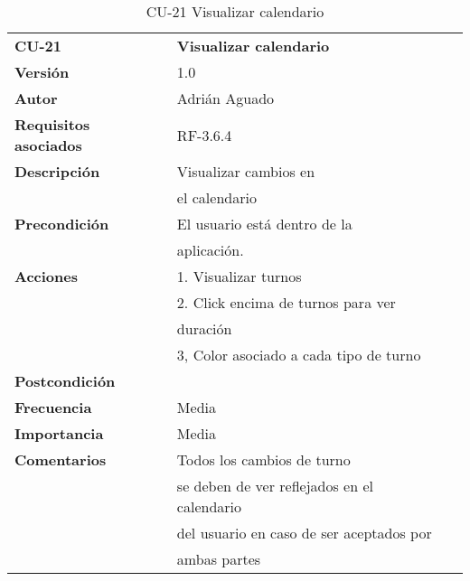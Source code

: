 \begin{table}[H]
\begin{tabular}{llr}  
\toprule
\begin{minipage}[b]{0.24\columnwidth}\raggedright\strut
\textbf{CU-21}\strut
\end{minipage} & \begin{minipage}[b]{0.72\columnwidth}\raggedright\strut
\textbf{Visualizar calendario}\strut
\end{minipage}\tabularnewline
\cmidrule(r){1-2}
\textbf{Versión}       & 1.0           \\
\textbf{Autor}       & Adrián  Aguado    \\
\textbf{Requisitos asociados}       & RF-3.6.4  \\
\textbf{Descripción} & Visualizar cambios en \\
& el  calendario \\
\textbf{Precondición}  & El usuario está dentro de la \\
& aplicación. \\
\textbf{Acciones} & 1. Visualizar turnos \\
& 2. Click encima de turnos para ver \\
&  duración  \\
&  3, Color asociado a cada tipo de turno  \\
\textbf{Postcondición} & \\
\textbf{Frecuencia} & Media          \\
\textbf{Importancia} & Media           \\
\textbf{Comentarios } &  Todos los cambios de turno  \\
 &  se deben de ver reflejados en el calendario  \\
  &  del usuario en caso de ser aceptados por  \\
    &  ambas partes \\
\bottomrule
\end{tabular}
\caption{CU-21 Visualizar calendario} 
\end{table}






